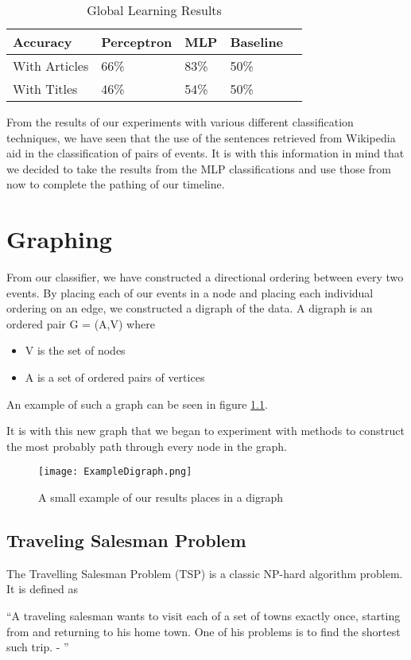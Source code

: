\documentclass[bsc,frontabs,twoside,singlespacing,parskip,deptreport]{infthesis}     %
\begin{document}
\begin{table}[H]
\centering
\label{table:global-learning}
\begin{tabular}{|p{5em}|l|l|p{4em}|l|}
  \hline
  {\small Accuracy}  & {\small Perceptron} & {\small MLP} & Baseline\\
  \hline
{\small With Articles}    & 66\%  & 83\% & 50\%\\
\hline
{\small With Titles} & 46\%  & 54\% & 50\%\\
\hline
\end{tabular}
\caption{Global Learning Results}
\end{table}

From the results of our experiments with various different classification techniques, we have seen that the use of the sentences retrieved
from Wikipedia aid in the classification of pairs of events. It is with this information in mind that we decided to take the results from
the MLP classifications and use those from now to complete the pathing of our timeline.

\chapter{Graphing} \label{chapter:graphing}
From our classifier, we have constructed a directional ordering between every two events.
By placing each of our events in a node and placing each individual ordering on an edge, we constructed
a digraph of the data.
A digraph is an ordered pair G = (A,V) where\cite{bang2008digraphs}
\begin{itemize}
  \item V is the set of nodes
  \item A is a set of ordered pairs of vertices
\end{itemize}
An example of such a graph can be seen in figure \ref{fig:digraph}.

It is with this new graph that we began to experiment with methods to construct the most probably path through every
node in the graph.


\begin{figure}
  \centering
  \texttt{[image: ExampleDigraph.png]}
  \caption{A small example of our results places in a digraph}
  \label{fig:digraph}
 \end{figure}

\section{Traveling Salesman Problem}
The Travelling Salesman Problem (TSP) is a classic NP-hard algorithm problem\cite{junger1995traveling}.%
It is defined as
\begin{center}
\enquote{A traveling salesman wants to visit each of a set of towns exactly once, starting
from and returning to his home town. One of his problems is to find the shortest
such trip. - \cite{junger1995traveling}}
\end{center}
\end{document}
